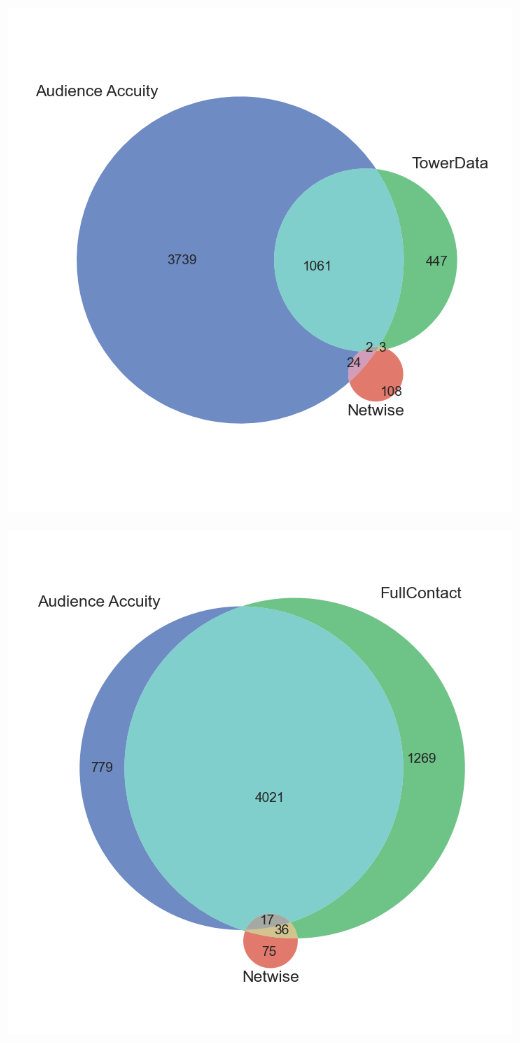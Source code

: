 \documentclass[11pt]{article} %
\begin{document}
\begin{minipage}[t]{0.45\linewidth}
  \includegraphics[width=1.1\linewidth]{../outputs/venn3_Audience Accuity_TowerData_Netwise.png}
  \label{fig:v3_AA_TD_N}
\end{minipage}\hfill
\begin{minipage}[t]{0.45\linewidth}
  \includegraphics[width=1.1\linewidth]{../outputs/venn3_Audience Accuity_FullContact_Netwise.png}
  \label{fig:v3_AA_FC_N}
\end{minipage}
\end{document}
